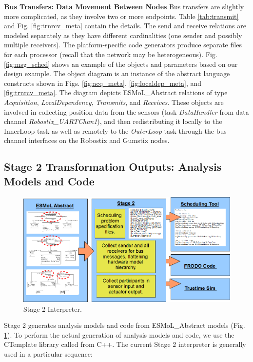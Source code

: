 \textbf{Bus Transfers: Data Movement Between Nodes}
Bus transfers are slightly more complicated, as they involve two or more
endpoints.  Table \ref{tab:transmit} and Fig.
\ref{fig:trnrcv_meta} contain the details. The send and receive relations
are modeled separately as they have different cardinalities (one sender 
and possibly multiple receivers).  The platform-specific code generators
produce separate files for each processor (recall that the network
may be heterogeneous). Fig. \ref{fig:msg_sched} shows an 
example of the objects and parameters based on our
design example.  The object diagram is an instance of the 
abstract language constructs shown in Figs. \ref{fig:acq_meta}, 
\ref{fig:localdep_meta}, and \ref{fig:trnrcv_meta}. 
The diagram depicts ESMoL\_Abstract relations of type
\emph{Acquisition}, \emph{LocalDependency}, \emph{Transmits}, 
and \emph{Receives}.  These objects are
involved in collecting position data from the sensors (task \emph{DataHandler}
from data channel \emph{Robostix\_UARTChan1}), and then redistributing it 
locally to the InnerLoop task as well as remotely to the \emph{OuterLoop} task
through the bus channel interfaces on the Robostix and Gumstix nodes.

\subsection{Stage 2 Transformation Outputs: Analysis Models and Code}

\begin{figure}
\centering
\includegraphics[width=0.95\columnwidth]{figures/stage2.png}
   \caption{Stage 2 Interpreter.}
   \label{fig:stage2}
\end{figure}

Stage 2 generates analysis models and code from ESMoL\_Abstract models
(Fig. \ref{fig:stage2}).  To perform 
the actual generation of analysis models and code, we use 
the CTemplate library\cite{tools:ctemplate} called from C++.
The current Stage 2 interpreter is generally used in a particular sequence:

